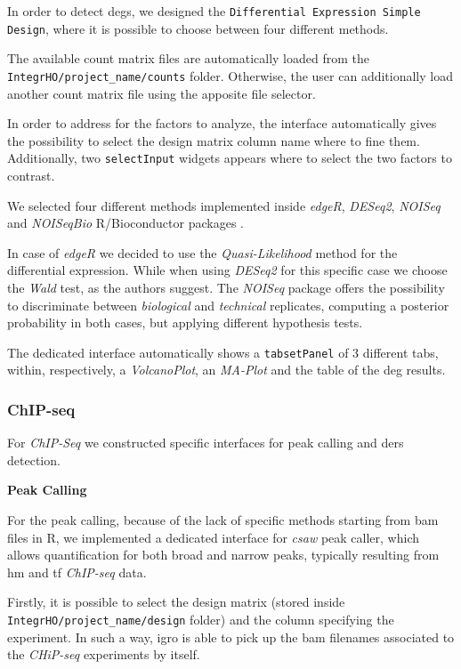 In order to detect \glspl{deg}, we designed the \lstinline!Differential Expression Simple Design!, where it is possible to choose between four different methods.

The available count matrix files are automatically loaded from the \lstinline!IntegrHO/project_name/counts! folder.
Otherwise, the user can additionally load another count matrix file using the apposite file selector.

In order to address for the factors to analyze, the interface automatically gives the possibility to select the design matrix column name where to fine them.
Additionally, two \lstinline!selectInput! widgets appears where to select the two factors to contrast.

We selected four different methods implemented inside \textit{edgeR}, \textit{DESeq2}, \textit{NOISeq} and \textit{NOISeqBio} R/Bioconductor packages \cite{Robinson2009, Love2014,Tarazona2012}.

In case of \textit{edgeR} we decided to use the \textit{Quasi-Likelihood} method for the differential expression.
While when using \textit{DESeq2} for this specific case we choose the \textit{Wald} test, as the authors suggest.
The \textit{NOISeq} package offers the possibility to discriminate between \textit{biological} and \textit{technical} replicates, computing a posterior probability in both cases, but applying different hypothesis tests.

The dedicated interface automatically shows a \lstinline!tabsetPanel! of 3 different tabs, within, respectively, a \textit{VolcanoPlot}, an \textit{MA-Plot} and the table of the \gls{deg} results.


\subsubsection{ChIP-seq}

For \textit{ChIP-Seq} we constructed specific interfaces for peak calling and \glspl{der} detection.

{\setlength{\parindent}{0cm}\textbf{Peak Calling}}

For the peak calling, because of the lack of specific methods starting from \gls{bam} files in R, we implemented a dedicated interface for \textit{csaw} \cite{Lun2015} peak caller, which allows quantification for both broad and narrow peaks, typically resulting from \gls{hm} and \gls{tf} \textit{ChIP-seq} data.

Firstly, it is possible to select the design matrix (stored inside \lstinline!IntegrHO/project_name/design! folder) and the column specifying the experiment.
In such a way, \gls{igro} is able to pick up the \gls{bam} filenames associated to the \textit{CHiP-seq} experiments by itself.

